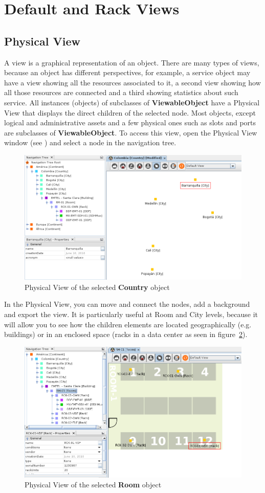 \documentclass[a4paper]{article}
\begin{document}
	\newpage
	\section{Default and Rack Views}
	\subsection{Physical View} \label{sec:default_view}
		A view is a graphical representation of an object. There are many types of views, because an object has different perspectives, for example, a service object may have a view showing all the resources associated to it, a second view showing how all those resources are connected and a third showing statistics about such service. All instances (objects) of subclasses of \textbf{ViewableObject} have a Physical View that displays the direct children of the selected node. Most objects, except logical and administrative assets and a few physical ones such as slots and ports are subclasses of \textbf{ViewableObject}. To access this view, open the Physical View window (see ) and select a node in the navigation tree.
		\begin{figure}[h!]
			\centering
			\includegraphics[width=0.9\linewidth]{img/default_view.png}
			\caption{Physical View of the selected \textbf{Country} object}
			\label{fig:default_view}
		\end{figure}
		
		In the Physical View, you can move and connect the nodes, add a background and export the view. It is particularly useful at Room and City levels, because it will allow you to see how the children elements are located geographically (e.g. buildings) or in an enclosed space (racks in a data center as seen in figure~\ref{fig:room_plan}).	
		\begin{figure}[h!]
			\centering
			\includegraphics[width=0.7\linewidth]{img/room_plan.png}
			\caption{Physical View of the selected \textbf{Room} object}
			\label{fig:room_plan}
		\end{figure}
		
\end{document}
